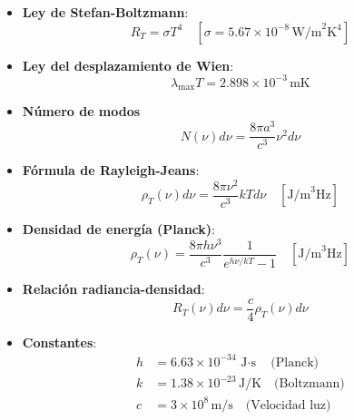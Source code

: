\documentclass{article}
\begin{document}
	\begin{itemize}
		\item \textbf{Ley de Stefan-Boltzmann}: 
		\begin{equation*}
			R_T = \sigma T^4\quad \left[\sigma = 5.67\times10^{-8}\,\text{W/m}^2\text{K}^4\right]
		\end{equation*}
		
		\item \textbf{Ley del desplazamiento de Wien}:
		\begin{equation*}
			\lambda_{\text{max}}T = 2.898\times10^{-3}\,\text{mK}
		\end{equation*}
	
		\item \textbf{Número de modos}
		\begin{equation}
			N(\nu)d\nu = \frac{8\pi a^3}{c^3}\nu^2 d\nu
		\end{equation}
		
		\item \textbf{Fórmula de Rayleigh-Jeans}:
		\begin{equation}
			\rho_T(\nu)d\nu = \frac{8\pi\nu^2}{c^3} kT d\nu \quad \left[\text{J/m}^3\text{Hz}\right]
		\end{equation}
		
		\item \textbf{Densidad de energía (Planck)}:
		\begin{equation*}
			\rho_T(\nu) = \frac{8\pi h\nu^3}{c^3}\frac{1}{e^{h\nu/kT} - 1}\quad \left[\text{J/m}^3\text{Hz}\right]
		\end{equation*}
	
		\item \textbf{Relación radiancia-densidad}:
		\begin{equation}
			R_T(\nu)d\nu = \frac{c}{4}\rho_T(\nu)d\nu
		\end{equation}
		
		\item \textbf{Constantes}:
		\begin{align*}
			h &= 6.63\times10^{-34}\,\text{J$\cdot$s} \quad \text{(Planck)}\\
			k &= 1.38\times10^{-23}\,\text{J/K} \quad \text{(Boltzmann)}\\
			c &= 3\times10^8\,\text{m/s} \quad \text{(Velocidad luz)}
		\end{align*}
	\end{itemize}
	
	
\end{document}
